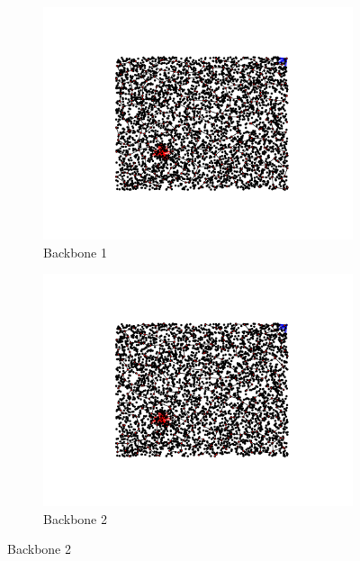 \documentclass[oneside, titlepage]{scrartcl}
\begin{document}
\begin{figure}[!h]
\begin{subfigure}{0.5\textwidth}
	\centering
	\includegraphics[width=0.9\linewidth]{figures/simplegraph3.pdf}
	\caption{Backbone 1}
\end{subfigure}%
\begin{subfigure}{0.5\textwidth}
	\centering
	\includegraphics[width=0.9\linewidth]{figures/simplegraph31.pdf}
	\caption{Backbone 2}
\end{subfigure}
\end{figure}
\end{document}
